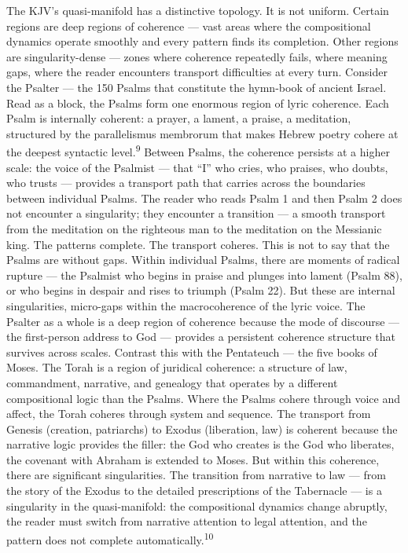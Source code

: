 The KJV’s quasi-manifold has a distinctive topology. It is not uniform. Certain regions are deep regions of coherence — vast areas where the compositional dynamics operate smoothly and every pattern finds its completion. Other regions are singularity-dense — zones where coherence repeatedly fails, where meaning gaps, where the reader encounters transport difficulties at every turn. Consider the Psalter — the 150 Psalms that constitute the hymn-book of ancient Israel. Read as a block, the Psalms form one enormous region of lyric coherence. Each Psalm is internally coherent: a prayer, a lament, a praise, a meditation, structured by the parallelismus membrorum that makes Hebrew poetry cohere at the deepest syntactic level.\textsuperscript{9} Between Psalms, the coherence persists at a higher scale: the voice of the Psalmist — that “I” who cries, who praises, who doubts, who trusts — provides a transport path that carries across the boundaries between individual Psalms. The reader who reads Psalm 1 and then Psalm 2 does not encounter a singularity; they encounter a transition — a smooth transport from the meditation on the righteous man to the meditation on the Messianic king. The patterns complete. The transport coheres. This is not to say that the Psalms are without gaps. Within individual Psalms, there are moments of radical rupture — the Psalmist who begins in praise and plunges into lament (Psalm 88), or who begins in despair and rises to triumph (Psalm 22). But these are internal singularities, micro-gaps within the macrocoherence of the lyric voice. The Psalter as a whole is a deep region of coherence because the mode of discourse — the first-person address to God — provides a persistent coherence structure that survives across scales. Contrast this with the Pentateuch — the five books of Moses. The Torah is a region of juridical coherence: a structure of law, commandment, narrative, and genealogy that operates by a different compositional logic than the Psalms. Where the Psalms cohere through voice and affect, the Torah coheres through system and sequence. The transport from Genesis (creation, patriarchs) to Exodus (liberation, law) is coherent because the narrative logic provides the filler: the God who creates is the God who liberates, the covenant with Abraham is extended to Moses. But within this coherence, there are significant singularities. The transition from narrative to law — from the story of the Exodus to the detailed prescriptions of the Tabernacle — is a singularity in the quasi-manifold: the compositional dynamics change abruptly, the reader must switch from narrative attention to legal attention, and the pattern does not complete automatically.\textsuperscript{10}

